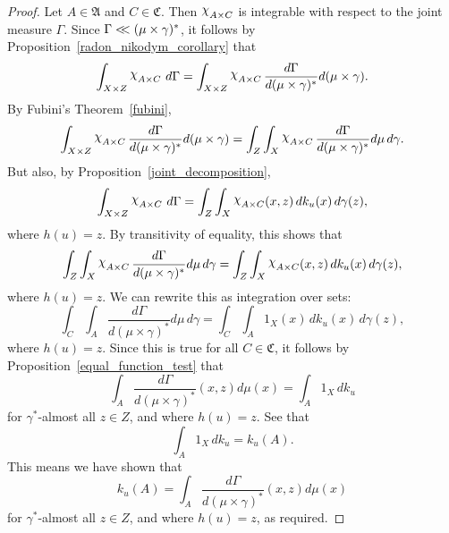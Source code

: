 \documentclass[
twoside=true,
paper=letter,
fontsize=9pt,
pagesize=auto,
leqno,
openany,
headsepline,
overfullrule,
]{scrbook}
\theoremstyle{plain}
\theoremstyle{plain}
\theoremstyle{definition}
\theoremstyle{bfnoteitalic}
\theoremstyle{bfnoteroman}
\newcommand{\sigalg}[1]{\mathfrak{#1}}
\newcommand{\charfunction}[1]{\mathop{{\raisebox{2pt}{$\chi$}}_{#1}}}
\newcommand{\sigmaalgebra}{\sigalg{A}}
\newcommand{\sigmaalgebraiii}{\sigalg{C}}
\newcommand{\funch}{h}
\newcommand{\funck}{k}
\newcommand{\measurespace}{X}
\newcommand{\measurespaceiii}{Z}
\newcommand{\mspaceelt}{x}
\newcommand{\mspaceeltiii}{z}
\newcommand{\abscont}{\mathrel{< \kern-3.5pt <}}
\newcommand{\measure}{\mu}
\newcommand{\measmu}{\mu}
\newcommand{\seti}{A}
\newcommand{\setiii}{C}
\newcommand{\uspaceelt}{u}
\newcommand{\measonprod}{\Gamma}%
\newcommand{\marginalthree}{\gamma}
\begin{document}
\begin{proof}
Let
$\seti\in\sigmaalgebra$
and
$\setiii\in\sigmaalgebraiii$.
Then
$\charfunction{\seti\times\setiii}$
is integrable with respect to the joint measure
$\measonprod$.
Since
$\measonprod \abscont (\measmu\times\marginalthree)^*$,
it follows by Proposition~\ref{radon_nikodym_corollary} that
\[
\int_{\measurespace\times\measurespaceiii}
\charfunction{\seti\times\setiii}
\, d\measonprod
=
\int_{\measurespace\times\measurespaceiii}
\charfunction{\seti\times\setiii}
\frac{d\measonprod}{d(\measure\times\marginalthree)^*}
d(\measmu\times\marginalthree).
\]
By Fubini's Theorem~\ref{fubini},
\[
\int_{\measurespace\times\measurespaceiii}
\charfunction{\seti\times\setiii}
\frac{d\measonprod}{d(\measure\times\marginalthree)^*}
d(\measmu\times\marginalthree)
=
\int_{\measurespaceiii}
\int_{\measurespace}
\charfunction{\seti\times\setiii}
\frac{d\measonprod}{d(\measure\times\marginalthree)^*}
d \measmu
\, d \marginalthree .
\]
But also, by Proposition~\ref{joint_decomposition},
\[
\int_{\measurespace\times\measurespaceiii}
\charfunction{\seti\times\setiii}
\, d \measonprod
=
\int_\measurespaceiii\int_\measurespace
\charfunction{\seti\times\setiii}
(\mspaceelt,\mspaceeltiii)
\, d \funck_\uspaceelt(\mspaceelt)
\, d \marginalthree(\mspaceeltiii),
\]
where  $\funch(\uspaceelt) = \mspaceeltiii$.
By transitivity of equality, this shows that
\[
\int_{\measurespaceiii}
\int_{\measurespace}
\charfunction{\seti\times\setiii}
\frac{d\measonprod}{d(\measure\times\marginalthree)^*}
d \measmu
\, d \marginalthree
=
\int_\measurespaceiii
\int_\measurespace
\charfunction{\seti\times\setiii}
(\mspaceelt,\mspaceeltiii)
\, d \funck_\uspaceelt(\mspaceelt)
\, d \marginalthree(\mspaceeltiii),
\]
where  $\funch(\uspaceelt) = \mspaceeltiii$.
We can rewrite this as integration over sets:
\[
\int_{\setiii}
\int_{\seti}
\frac{d\measonprod}{d(\measure\times\marginalthree)^*}
d \measmu
\, d \marginalthree
=
\int_\setiii
\int_\seti
1_\measurespace
(\mspaceelt)
\, d \funck_\uspaceelt(\mspaceelt)
\, d \marginalthree(\mspaceeltiii),
\]
where  $\funch(\uspaceelt) = \mspaceeltiii$.
Since this is true for all $\setiii\in\sigmaalgebraiii$, it follows by Proposition~\ref{equal_function_test} that
\[
\int_{\seti}
\frac{d\measonprod}{d(\measure\times\marginalthree)^*}
(\mspaceelt,\mspaceeltiii)
d \measmu(\mspaceelt)
=
\int_\seti
1_\measurespace
\, d \funck_\uspaceelt
\]
for $\marginalthree^*$\hyp{}almost all $\mspaceeltiii\in\measurespaceiii$, and where
$\funch(\uspaceelt)=\mspaceeltiii$.
See that
\[
\int_\seti
1_\measurespace
\, d \funck_\uspaceelt
=
\funck_\uspaceelt(\seti).
\]
This means we have shown that
\[
\funck_\uspaceelt(\seti)
=
\int_{\seti}
\frac{d\measonprod}{d(\measure\times\marginalthree)^*}
(\mspaceelt,\mspaceeltiii)
d \measmu(\mspaceelt)
\]
for $\marginalthree^*$\hyp{}almost all $\mspaceeltiii\in\measurespaceiii$, and where
$\funch(\uspaceelt)=\mspaceeltiii$, as required.
\end{proof}
\end{document}
